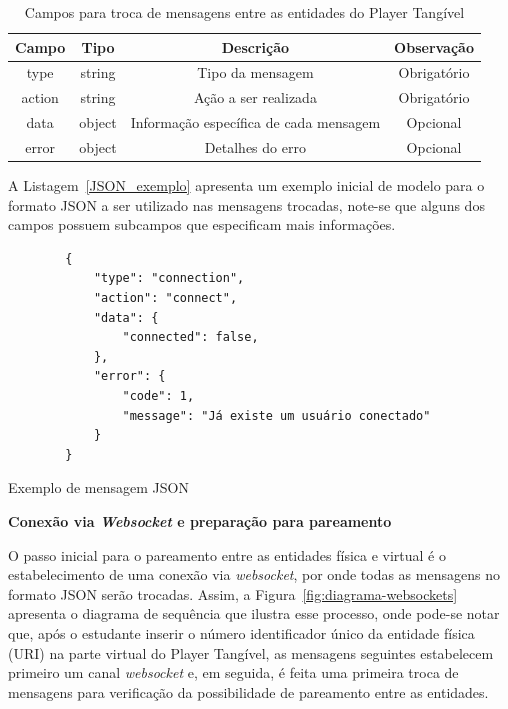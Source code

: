 \begin{table}[htb]
	\caption{Campos para troca de mensagens entre as entidades do Player Tangível}
	\centering
	\begin{tabular}{|c|c|c|c|}
		\hline
		\rowcolor[HTML]{C0C0C0} 
		\textbf{Campo} & \textbf{Tipo} & \textbf{Descrição} & \textbf{Observação} \\ \hline
		type & string & Tipo da mensagem & Obrigatório \\ \hline
		action & string & Ação a ser realizada & Obrigatório \\ \hline
		data & object & Informação específica de cada mensagem & Opcional \\ \hline
		error & object & Detalhes do erro & Opcional \\ \hline
	\end{tabular}
	\label{tabela:JSON}
\end{table}

A Listagem~\ref{JSON_exemplo} apresenta um exemplo inicial de modelo para o formato JSON a ser utilizado nas mensagens trocadas, note-se que alguns dos campos possuem subcampos que especificam mais informações.

\begin{listing}[htb]
	\begin{verbatim}
		{
			"type": "connection",
			"action": "connect",
			"data": {
				"connected": false,
			},
			"error": {
				"code": 1,
				"message": "Já existe um usuário conectado"
			}
		}
	\end{verbatim}
	\caption{Exemplo de mensagem JSON}
	\label{JSON_exemplo}
\end{listing}

\textbf{Conexão via \textit{Websocket} e preparação para pareamento}

O passo inicial para o pareamento entre as entidades física e virtual é o estabelecimento de uma conexão via \textit{websocket}, por onde todas as mensagens no formato JSON serão trocadas. Assim, a Figura~\ref{fig:diagrama-websockets} apresenta o diagrama de sequência que ilustra esse processo, onde pode-se notar que, após o estudante inserir o número identificador único da entidade física (URI) na parte virtual do Player Tangível, as mensagens seguintes estabelecem primeiro um canal \textit{websocket} e, em seguida, é feita uma primeira troca de mensagens para verificação da possibilidade de pareamento entre as entidades.

